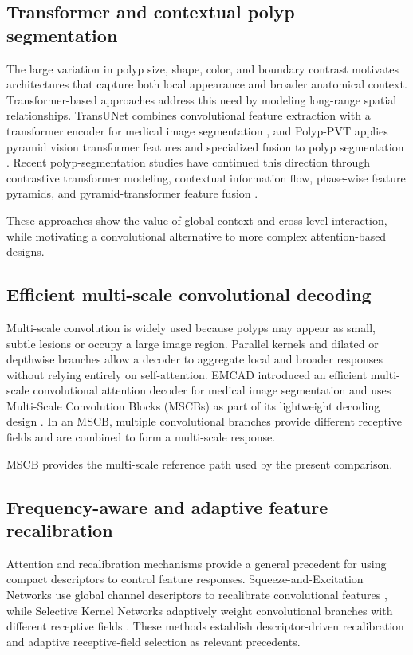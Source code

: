 \subsection{Transformer and contextual polyp segmentation}

The large variation in polyp size, shape, color, and boundary contrast motivates
architectures that capture both local appearance and broader anatomical context.
Transformer-based approaches address this need by modeling long-range spatial
relationships. TransUNet combines convolutional feature extraction with a
transformer encoder for medical image segmentation \cite{transunet}, and
Polyp-PVT applies pyramid vision transformer features and specialized fusion to
polyp segmentation \cite{polyppvt}. Recent polyp-segmentation studies have
continued this direction through contrastive transformer modeling, contextual
information flow, phase-wise feature pyramids, and pyramid-transformer feature
fusion \cite{ctnet,cifformer,pfprnet,mfnet}.

These approaches show the value of global context and cross-level interaction,
while motivating a convolutional alternative to more complex attention-based
designs.

\subsection{Efficient multi-scale convolutional decoding}

Multi-scale convolution is widely used because polyps may appear as small,
subtle lesions or occupy a large image region. Parallel kernels and dilated or
depthwise branches allow a decoder to aggregate local and broader responses
without relying entirely on self-attention. EMCAD introduced an efficient
multi-scale convolutional attention decoder for medical image segmentation and
uses Multi-Scale Convolution Blocks (MSCBs) as part of its lightweight decoding
design \cite{emcad}. In an MSCB, multiple convolutional branches provide
different receptive fields and are combined to form a multi-scale response.

MSCB provides the multi-scale reference path used by the present comparison.

\subsection{Frequency-aware and adaptive feature recalibration}

Attention and recalibration mechanisms provide a general precedent for using
compact descriptors to control feature responses. Squeeze-and-Excitation
Networks use global channel descriptors to recalibrate convolutional features
\cite{senet}, while Selective Kernel Networks adaptively weight convolutional
branches with different receptive fields \cite{sknet}. These methods establish
descriptor-driven recalibration and adaptive receptive-field selection as relevant
precedents.

